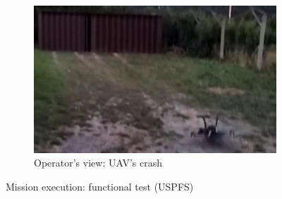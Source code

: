 \begin{figure}[!hbt]
\begin{subfigure}[t]{0.49\textwidth}
    \includegraphics[width=\linewidth]{./img/png/uspfs-crash-myView-final-crop} %
    \caption{Operator's view: UAV's crash}%
    \label{fig:mission-exec-uspfs-final}
  \end{subfigure}
%  
  \caption{Mission execution: functional test (USPFS)}
  \label{fig:mission-exec-uspfs}
\end{figure}




